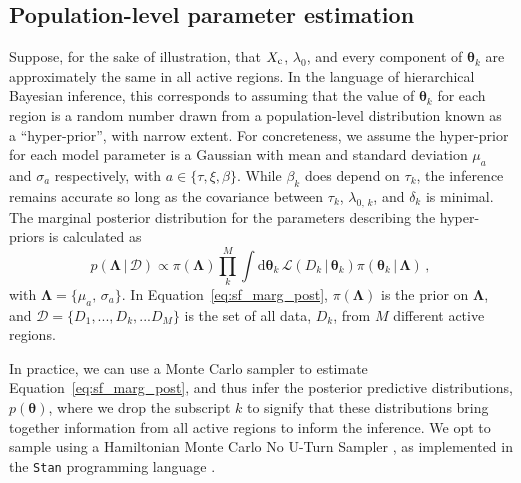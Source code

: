 \begin{subappendices}
\subsection{Population-level parameter estimation} \label{app:sf_sub_hier}
Suppose, for the sake of illustration, that $X_\textrm{c}$, $\lambda_0$, and every component of $\boldsymbol{\theta}_k$ are approximately the same in all active regions. In the language of hierarchical Bayesian inference, this corresponds to assuming that the value of $\boldsymbol{\theta}_k$ for each region is a random number drawn from a population-level distribution known as a ``hyper-prior'', with narrow extent. For concreteness, we assume the hyper-prior for each model parameter is a Gaussian with mean and standard deviation $\mu_a$ and $\sigma_a$ respectively, with $a \in \{\tau, \xi, \beta \}$. While $\beta_k$ does depend on $\tau_k$, the inference remains accurate so long as the covariance between $\tau_k$, $\lambda_{0,\,k}$, and $\delta_k$ is minimal. The marginal posterior distribution for the parameters describing the hyper-priors is calculated as
\begin{equation}
p(\boldsymbol{\Lambda}\,|\, \mathcal{D}) \propto \pi(\boldsymbol{\Lambda}) \prod_k^M \int \textrm{d}\boldsymbol{\theta}_k\, \mathcal{L}(D_k\,|\,\boldsymbol{\theta}_k) \pi( \boldsymbol{\theta}_k\,|\,\boldsymbol{\Lambda})\,, \label{eq:sf_marg_post}
\end{equation}
with $\boldsymbol{\Lambda} = \{\mu_{a},\,\sigma_{a} \}$. In Equation~\eqref{eq:sf_marg_post}, $\pi(\boldsymbol{\Lambda})$ is the prior on $\boldsymbol{\Lambda}$, and $\mathcal{D} = \{D_1,...,D_k,...D_M \}$ is the set of all data, $D_k$, from $M$ different active regions.

In practice, we can use a Monte Carlo sampler to estimate Equation~\eqref{eq:sf_marg_post}, and thus infer the posterior predictive distributions, $p(\boldsymbol{\theta})$, where we drop the subscript $k$ to signify that these distributions bring together information from all active regions to inform the inference. We opt to sample using a Hamiltonian Monte Carlo No U-Turn Sampler \citep{Betancourt2018}, as implemented in the \texttt{Stan} programming language \citep{stan2022}. 


\end{subappendices}
